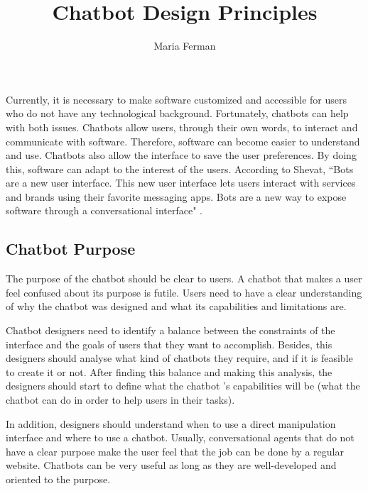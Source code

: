 \documentclass[a4paper,10pt]{article}
\title{Chatbot Design Principles}
\author{Maria Ferman}
\begin{document}
\maketitle
Currently, it is necessary to make software customized and accessible for users who do not have any technological background. Fortunately, chatbots can help with both issues. Chatbots allow users, through their own words, to interact and communicate with software. Therefore, software can become easier to understand and use. Chatbots also allow the interface to save the user preferences. By doing this, software can adapt to the interest of the users. According to Shevat,  ``Bots are a new user interface. This new user interface lets users interact with services and brands using their favorite messaging apps. Bots are a new way to expose software through a conversational interface" \cite{Shevat2017}. 

\subsection*{Chatbot Purpose}

The purpose of the chatbot should be clear to users. A chatbot that makes a user feel confused about its purpose is futile. Users need to have a clear understanding of why the chatbot was designed and what its capabilities and limitations are. 

Chatbot designers need to identify a balance between the constraints of the interface and the goals of users that they want to accomplish. Besides, this designers should analyse what kind of chatbots they require, and if it is feasible to create it or not. After finding this balance and making this analysis, the designers should start to define what the chatbot 's capabilities will be (what the chatbot can do in order to help users in their tasks). 

In addition, designers should understand when to use a direct manipulation interface and where to use a chatbot. Usually, conversational agents that do not have a clear purpose make the user feel that the job can be done by a regular website. Chatbots can be very useful as long as they are well-developed and oriented to the purpose. %
\end{document}
